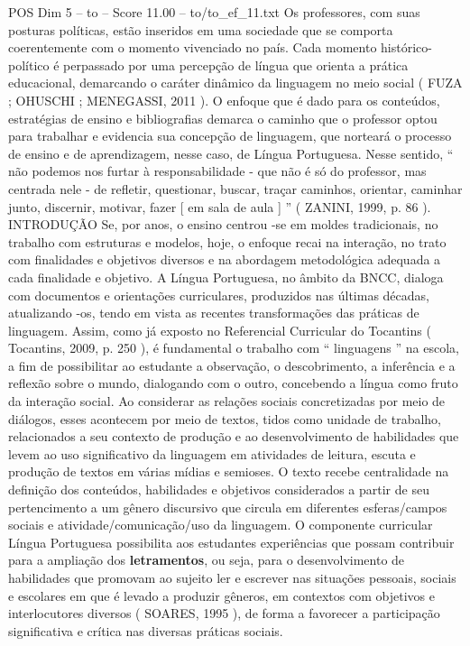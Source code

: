 \begin{textsample}{POS Dim 5 – to – Score 11.00 – to/to\_ef\_11.txt}  \label{ex:f5_pos_026}
Os professores, com suas posturas políticas, estão inseridos em uma sociedade que se comporta coerentemente com o momento vivenciado no país.
Cada momento histórico-político é perpassado por uma percepção de língua que orienta a prática educacional, demarcando o caráter dinâmico da linguagem no meio social ( FUZA ; OHUSCHI ; MENEGASSI, 2011 ).
O enfoque que é dado para os conteúdos, estratégias de ensino e bibliografias demarca o caminho que o professor optou para trabalhar e evidencia sua concepção de linguagem, que norteará o processo de ensino e de aprendizagem, nesse caso, de Língua Portuguesa.
Nesse sentido, “ não podemos nos furtar à responsabilidade - que não é só do professor, mas centrada nele - de refletir, questionar, buscar, traçar caminhos, orientar, caminhar junto, discernir, motivar, fazer [ em sala de aula ] ” ( ZANINI, 1999, p. 86 ).
INTRODUÇÃO Se, por anos, o ensino centrou -se em moldes tradicionais, no trabalho com estruturas e modelos, hoje, o enfoque recai na interação, no trato com finalidades e objetivos diversos e na abordagem metodológica adequada a cada finalidade e objetivo.
A Língua Portuguesa, no âmbito da BNCC, dialoga com documentos e orientações curriculares, produzidos nas últimas décadas, atualizando -os, tendo em vista as recentes transformações das práticas de linguagem.
Assim, como já exposto no Referencial Curricular do Tocantins ( Tocantins, 2009, p. 250 ), é fundamental o trabalho com “ linguagens ” na escola, a fim de possibilitar ao estudante a observação, o descobrimento, a inferência e a reflexão sobre o mundo, dialogando com o outro, concebendo a língua como fruto da interação social.
Ao considerar as relações sociais concretizadas por meio de diálogos, esses acontecem por meio de textos, tidos como unidade de trabalho, relacionados a seu contexto de produção e ao desenvolvimento de habilidades que levem ao uso significativo da linguagem em atividades de leitura, escuta e produção de textos em várias mídias e semioses.
O texto recebe centralidade na definição dos conteúdos, habilidades e objetivos considerados a partir de seu pertencimento a um gênero discursivo que circula em diferentes esferas/campos sociais e atividade/comunicação/uso da linguagem.
O componente curricular Língua Portuguesa possibilita aos estudantes experiências que possam contribuir para a ampliação dos \textbf{letramentos}, ou seja, para o desenvolvimento de habilidades que promovam ao sujeito ler e escrever nas situações pessoais, sociais e escolares em que é levado a produzir gêneros, em contextos com objetivos e interlocutores diversos ( SOARES, 1995 ), de forma a favorecer a participação significativa e crítica nas diversas práticas sociais.

\end{textsample}
